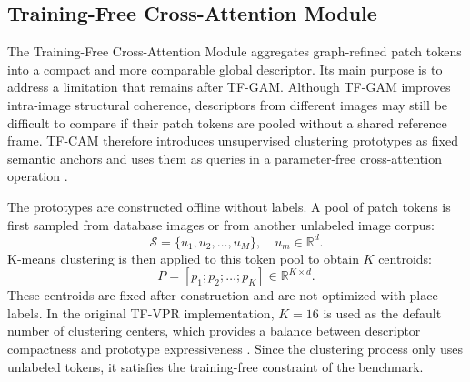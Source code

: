 \subsection{Training-Free Cross-Attention Module}
The Training-Free Cross-Attention Module aggregates graph-refined patch tokens into a compact and more comparable global descriptor. Its main purpose is to address a limitation that remains after TF-GAM. Although TF-GAM improves intra-image structural coherence, descriptors from different images may still be difficult to compare if their patch tokens are pooled without a shared reference frame. TF-CAM therefore introduces unsupervised clustering prototypes as fixed semantic anchors and uses them as queries in a parameter-free cross-attention operation \cite{wang2026tfvpr}.

The prototypes are constructed offline without labels. A pool of patch tokens is first sampled from database images or from another unlabeled image corpus:
\begin{equation}
  \mathcal{S} = \{u_1,u_2,\ldots,u_M\}, \quad u_m \in \mathbb{R}^{d}.
\end{equation}
K-means clustering is then applied to this token pool to obtain \(K\) centroids:
\begin{equation}
  P = [p_1;p_2;\ldots;p_K] \in \mathbb{R}^{K \times d}.
\end{equation}
These centroids are fixed after construction and are not optimized with place labels. In the original TF-VPR implementation, \(K=16\) is used as the default number of clustering centers, which provides a balance between descriptor compactness and prototype expressiveness \cite{wang2026tfvpr}. Since the clustering process only uses unlabeled tokens, it satisfies the training-free constraint of the benchmark.

